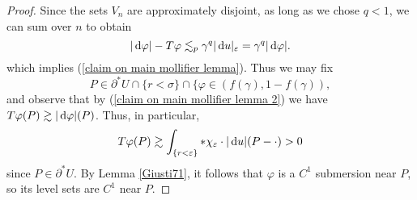 \begin{proof}

Since the sets $V_n$ are approximately disjoint, as long as we chose $q < 1$, we can sum over $n$ to obtain
\begin{equation}\label{claim on main mollifier lemma 2}
|\mathop{}\!\mathrm{d} \varphi| - T\varphi \lesssim_p \gamma^q |\mathop{}\!\mathrm{d} u|_\varepsilon = \gamma^q |\mathop{}\!\mathrm{d} \varphi|.
\end{equation}
which implies (\ref{claim on main mollifier lemma}). Thus we may fix
$$P \in \partial^* U \cap \{r < \sigma\} \cap \{\varphi \in (f(\gamma), 1 - f(\gamma)),$$
and observe that by (\ref{claim on main mollifier lemma 2}) we have $T\varphi(P) \gtrsim |\mathop{}\!\mathrm{d} \varphi|(P)$.
Thus, in particular,
$$T\varphi(P) \gtrsim \int_{\{r < \varepsilon\}} *\chi_\varepsilon \cdot |\mathop{}\!\mathrm{d} u|(P - \cdot) > 0$$
since $P \in \partial^* U$.
By Lemma \ref{Giusti71}, it follows that $\varphi$ is a $C^1$ submersion near $P$, so its level sets are $C^1$ near $P$.
\end{proof}

